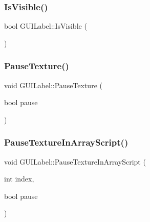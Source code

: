 \hypertarget{class_g_u_i_label_ae66dc36d94c5a4aee59ff6ae3fe96951}{}\label{class_g_u_i_label_ae66dc36d94c5a4aee59ff6ae3fe96951} 
\subsubsection{\texorpdfstring{Is\+Visible()}{IsVisible()}}
{\footnotesize\ttfamily bool G\+U\+I\+Label\+::\+Is\+Visible (\begin{DoxyParamCaption}{ }\end{DoxyParamCaption})}

\hypertarget{class_g_u_i_label_acd661f2d9f4d64e54bb07087bc99d18f}{}\label{class_g_u_i_label_acd661f2d9f4d64e54bb07087bc99d18f} 
\subsubsection{\texorpdfstring{Pause\+Texture()}{PauseTexture()}}
{\footnotesize\ttfamily void G\+U\+I\+Label\+::\+Pause\+Texture (\begin{DoxyParamCaption}\item[{bool}]{pause }\end{DoxyParamCaption})}

\hypertarget{class_g_u_i_label_a220fc075b562a29adc12ad2fe8198a49}{}\label{class_g_u_i_label_a220fc075b562a29adc12ad2fe8198a49} 
\subsubsection{\texorpdfstring{Pause\+Texture\+In\+Array\+Script()}{PauseTextureInArrayScript()}}
{\footnotesize\ttfamily void G\+U\+I\+Label\+::\+Pause\+Texture\+In\+Array\+Script (\begin{DoxyParamCaption}\item[{int}]{index,  }\item[{bool}]{pause }\end{DoxyParamCaption})}

\hypertarget{class_g_u_i_label_af1fe8e2667914b28595d598acd834f99}{}\label{class_g_u_i_label_af1fe8e2667914b28595d598acd834f99} 
